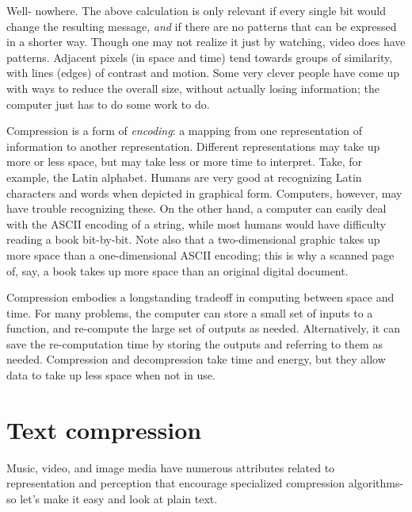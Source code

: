 Well- nowhere. The above calculation is only relevant if every single bit would change the resulting message, \textit{and} if there are no patterns that can be expressed in a shorter way. Though one may not realize it just by watching, video does have patterns. Adjacent pixels (in space and time) tend towards groups of similarity, with lines (edges) of contrast and motion. Some very clever people have come up with ways to reduce the overall size, without actually losing information; the computer just has to do some work to do.

Compression is a form of \textit{encoding}: a mapping from one representation of information to another representation. Different representations may take up more or less space, but may take less or more time to interpret. Take, for example, the Latin alphabet. Humans are very good at recognizing Latin characters and words when depicted in graphical form. Computers, however, may have trouble recognizing these. On the other hand, a computer can easily deal with the ASCII encoding of a string, while most humans would have difficulty reading a book bit-by-bit. Note also that a two-dimensional graphic takes up more space than a one-dimensional ASCII encoding; this is why a scanned page of, say, a book takes up more space than an original digital document.



Compression embodies a longstanding tradeoff in computing between space and time. For many problems, the computer can store a small set of inputs to a function, and re-compute the large set of outputs as needed. Alternatively, it can save the re-computation time by storing the outputs and referring to them as needed. Compression and decompression take time and energy, but they allow data to take up less space when not in use.

\section{Text compression}

Music, video, and image media have numerous attributes related to representation and perception that encourage specialized compression algorithms- so let's make it easy and look at plain text.


